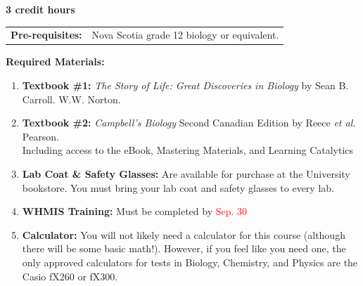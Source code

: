 \documentclass[hidelinks]{article}
\begin{document}
	\textbf{3 credit hours}

	\begin{tabular}{@{} p{2.6cm} l }
		\textbf{Pre-requisites:} & Nova Scotia grade 12 biology or equivalent.\\ 
	\end{tabular}


	\textbf{Required Materials:}
	\begin{enumerate}[topsep=-8pt]
		\item \textbf{Textbook \#1:} \emph{The Story of Life: Great Discoveries in Biology} by Sean B. Carroll. W.W. Norton.
		\item \textbf{Textbook \#2:} \emph{Campbell's Biology} Second Canadian Edition by Reece \emph{et al.} Pearson.\\
				Including access to the eBook, Mastering Materials, and Learning Catalytics
		\item \textbf{Lab Coat \& Safety Glasses:} Are available for purchase at the University bookstore. You must bring your lab coat and safety glasses to every lab.
		\item \textbf{WHMIS Training:} Must be completed by \textcolor{red}{Sep. 30}		
		\item \textbf{Calculator:} You will not likely need a calculator for this course (although there will be some basic math!). However, if you feel like you need one, the only approved calculators for tests in Biology, Chemistry, and Physics are the Casio fX260 or fX300.\\
	\end{enumerate}	
\end{document}
